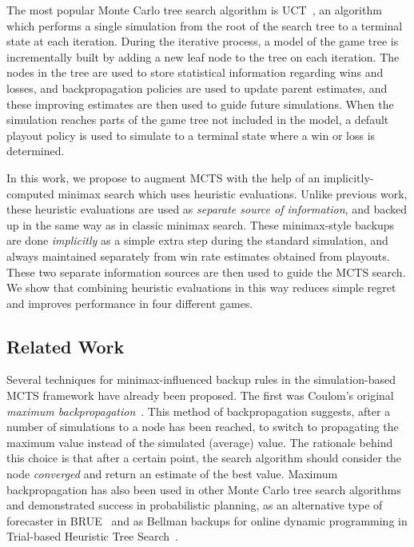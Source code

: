\documentclass[letterpaper]{article}
\begin{document}
The most popular Monte Carlo tree search algorithm is UCT~\cite{Kocsis06Bandit}, an algorithm
which performs a single simulation from the root of the search tree to a terminal state at each iteration. 
During the iterative process, a model of the game tree is incrementally built by adding a 
new leaf node to the tree on each iteration. 
The nodes in the tree are used to store statistical information regarding wins and losses, and backpropagation
policies are used to update parent estimates, and these improving estimates are then used to guide future simulations. 
When the simulation reaches parts of the game tree not included in the model, a default playout policy
is used to simulate to a terminal state where a win or loss is determined. 

In this work, we propose to augment MCTS with the help of 
an implicitly-computed minimax search which uses heuristic evaluations. 
Unlike previous work, these heuristic evaluations are used as {\it separate source of information}, 
and backed up in the same way as in classic minimax search. These minimax-style backups are done {\it implicitly}
as a simple extra step during the standard simulation, and always maintained separately from win rate estimates obtained
from playouts. These two separate information sources are then used to guide the MCTS search. 
We show that combining heuristic evaluations in this way reduces simple regret and improves performance in four 
different games. 

\subsection{Related Work}

Several techniques for minimax-influenced backup rules in the simulation-based MCTS framework have already been proposed. 
The first was Coulom's original {\it maximum backpropagation}~\cite{Coulom06Efficient}. This method of backpropagation
suggests, after a number of simulations to a node has been reached, to switch to propagating the maximum value instead 
of the simulated (average) value. 
The rationale behind this choice is that after a certain point, the search algorithm should consider the node
{\it converged} and return an estimate of the best value. 
Maximum backpropagation has also been used in other Monte Carlo tree search algorithms and demonstrated success in
probabilistic planning, as an alternative type of forecaster in BRUE~\cite{Feldman13Theoretically} and as Bellman 
backups for online dynamic programming in Trial-based Heuristic Tree Search~\cite{Keller13Trial}.
\end{document}
